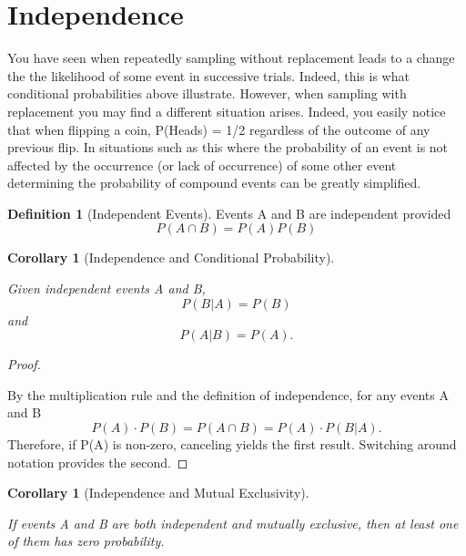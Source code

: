 \documentclass[10pt,]{book}
\theoremstyle{plain}
\newtheorem{corollary}[theorem]{Corollary}
\theoremstyle{definition}
\newtheorem{definition}[theorem]{Definition}
\theoremstyle{definition}
\theoremstyle{definition}
\numberwithin{equation}{section}
\begin{document}
\section[{Independence}]{Independence}\label{section-22}
\typeout{************************************************}
\typeout{************************************************}

		You have seen when repeatedly sampling without replacement leads to a change the the likelihood of some event in successive trials. Indeed, this is what conditional probabilities above illustrate. However, when sampling with replacement you may find a different situation arises. Indeed, you easily notice that when flipping a coin, P(Heads) = 1/2 regardless of the outcome of any previous flip.  In situations such as this where the probability of an event is not affected by the occurrence (or lack of occurrence) of some other event determining the probability of compound events can be greatly simplified.
\begin{definition}[{Independent Events}]\label{definition-20}
Events A and B are independent provided 
		\begin{equation*}P(A \cap B) = P(A) P(B)\end{equation*}\end{definition}
\begin{corollary}[{Independence and Conditional Probability}]\label{corollary-3}

			Given independent events A and B, 
			\begin{equation*}P(B | A) = P(B)\end{equation*} and \begin{equation*}P(A | B) = P(A).\end{equation*}\end{corollary}
\begin{proof}\hypertarget{proof-19}{}
By the multiplication rule and the definition of independence, for any events A and B
			\begin{equation*}P(A) \cdot P(B) = P(A \cap B) = P(A) \cdot P(B | A) .\end{equation*}
			Therefore, if P(A) is non-zero, canceling yields the first result. Switching around notation provides the second.
\end{proof}
\begin{corollary}[{Independence and Mutual Exclusivity}]\label{corollary-4}

			If events A and B are both independent and mutually exclusive, then at least one of them has zero probability.
		\end{corollary}
\end{document}
